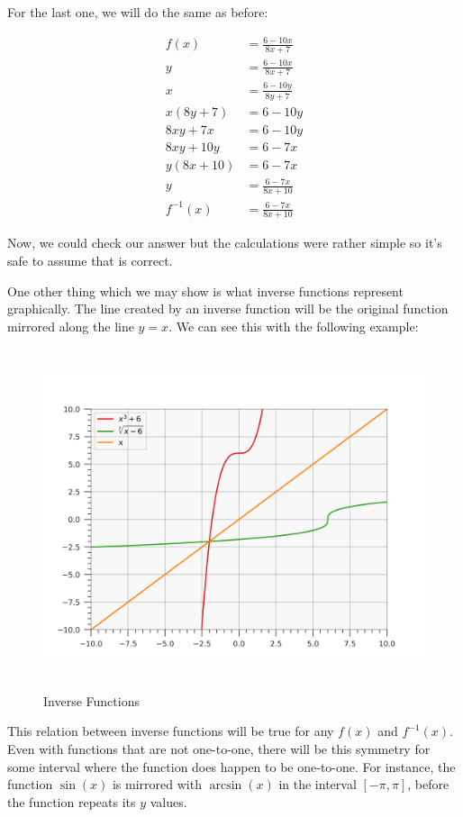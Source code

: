 \documentclass[12pt]{article}
\begin{document}
For the last one, we will do the same as before:

\begin{align}
    f(x)       & = \frac{6-10x}{8x+7}   \\
    y          & = \frac{6-10x}{8x+7}   \\
    x          & = \frac{6-10y}{8y+7}   \\
    x(8y+7)    & = 6-10y                \\
    8xy + 7x   & = 6-10y                \\
    8xy + 10y  & = 6-7x                 \\
    y(8x + 10) & = 6-7x                 \\
    y          & = \frac{6-7x}{8x + 10} \\
    f^{-1}(x)  & = \frac{6-7x}{8x + 10}
\end{align}

Now, we could check our answer but the calculations were rather simple so it's safe to assume that is correct.

One other thing which we may show is what inverse functions represent graphically.
The line created by an inverse function will be the original function mirrored along the line $y=x$.
We can see this with the following example:

\begin{figure}[H]
    \centering
    \includegraphics[width=12.5cm, height=10cm]{inverse_functions.png}
    \caption{Inverse Functions}
    \label{fig:fig1}
\end{figure}

This relation between inverse functions will be true for any $f(x)$ and $f^{-1}(x)$.
Even with functions that are not one-to-one, there will be this symmetry for some interval where the function does happen to be one-to-one.
For instance, the function $\sin(x)$ is mirrored with $\arcsin(x)$ in the interval $[-\pi, \pi]$, before the function repeats its $y$ values.
\end{document}

